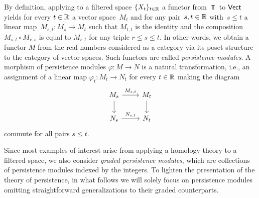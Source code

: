 By definition, applying to a filtered space $\{X_t\}_{t \in \mathbb{R}}$ a functor from $\Top$ to $\mathsf{Vect}$ yields for every $t \in \mathbb{R}$ a vector space~$M_t$ and for any pair~$s, t \in \mathbb{R}$ with~$s \leq t$ a linear map~$M_{s,t} \colon M_s \to M_t$ such that $M_{t,t}$ is the identity and the composition $M_{s,t} \circ M_{r,s}$ is equal to $M_{r,t}$ for any triple $r \leq s \leq t$.
In other words, we obtain a functor $M$ from the real numbers considered as a category via its poset structure to the category of vector spaces.
Such functors are called \emph{persistence modules}.
A morphism of persistence modules $\varphi \colon M \to N$ is a natural transformation, i.e., an assignment of a linear map $\varphi_t \colon M_t \to N_t$ for every $t \in \mathbb{R}$ making the diagram
\begin{equation*}
\begin{tikzcd}
M_{s} \arrow[r, "M_{s,t}"] \arrow[d] & M_{t} \arrow[d] \\
N_{s} \arrow[r, "N_{s,t}"] & N_{t}
\end{tikzcd}
\end{equation*}
commute for all pairs $s \leq t$.

Since most examples of interest arise from applying a homology theory to a filtered space, we also consider \emph{graded persistence modules}, which are collections of persistence modules indexed by the integers.
To lighten the presentation of the theory of persistence, in what follows we will solely focus on persistence modules omitting straightforward generalizations to their graded counterparts.

